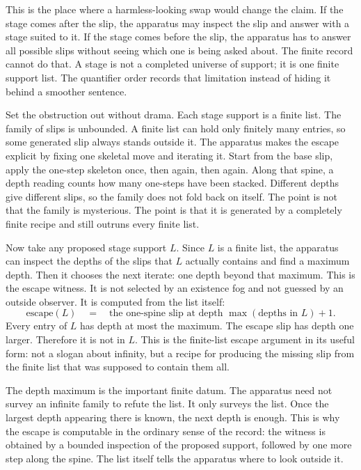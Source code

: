 This is the place where a harmless-looking swap would change the claim. If the
stage comes after the slip, the apparatus may inspect the slip and answer with a
stage suited to it. If the stage comes before the slip, the apparatus has to
answer all possible slips without seeing which one is being asked about. The
finite record cannot do that. A stage is not a completed universe of support; it
is one finite support list. The quantifier order records that limitation instead
of hiding it behind a smoother sentence.

Set the obstruction out without drama. Each stage support is a finite list. The
family of slips is unbounded. A finite list can hold only finitely many entries,
so some generated slip always stands outside it. The apparatus makes the escape
explicit by fixing one skeletal move and iterating it. Start from the base slip,
apply the one-step skeleton once, then again, then again. Along that spine, a
depth reading counts how many one-steps have been stacked. Different depths give
different slips, so the family does not fold back on itself. The point is not
that the family is mysterious. The point is that it is generated by a completely
finite recipe and still outruns every finite list.

Now take any proposed stage support \(L\). Since \(L\) is a finite list, the
apparatus can inspect the depths of the slips that \(L\) actually contains and
find a maximum depth. Then it chooses the next iterate: one depth beyond that
maximum. This is the escape witness. It is not selected by an existence fog and
not guessed by an outside observer. It is computed from the list itself:
\[
  \text{escape}(L)
  \quad=\quad
  \text{the one-spine slip at depth } \max(\text{depths in }L)+1 .
\]
Every entry of \(L\) has depth at most the maximum. The escape slip has depth one
larger. Therefore it is not in \(L\). This is the finite-list escape argument in
its useful form: not a slogan about infinity, but a recipe for producing the
missing slip from the finite list that was supposed to contain them all.

The depth maximum is the important finite datum. The apparatus need not survey an
infinite family to refute the list. It only surveys the list. Once the largest
depth appearing there is known, the next depth is enough. This is why the escape
is computable in the ordinary sense of the record: the witness is obtained by a
bounded inspection of the proposed support, followed by one more step along the
spine. The list itself tells the apparatus where to look outside it.

